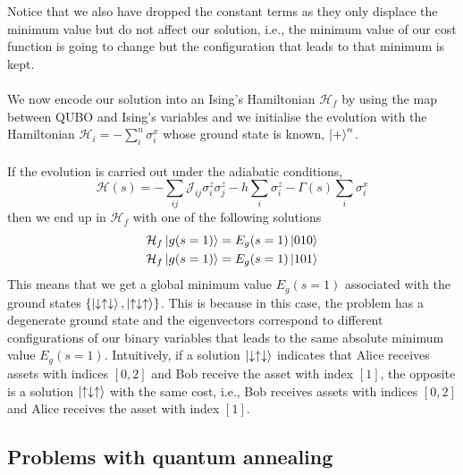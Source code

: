 Notice that we also have dropped the constant terms as they only displace the minimum value but do not affect our solution, i.e., the minimum value of our cost function is going to change but the configuration that leads to that minimum is kept.\\\\
We now encode our solution into an Ising's Hamiltonian $\mathcal{H}_{f}$ by using the map between QUBO and Ising's variables and we initialise the evolution with the Hamiltonian $\mathcal{H}_{i} = -\sum_{i}^{n}\sigma_{i}^{x}$ whose ground state is known, $\ket{+}^{n}$.\\\\
If the evolution is carried out under the adiabatic conditions,
\begin{equation}
    \mathcal{H}(s) = -\sum_{ij}\mathcal{J}_{ij}\sigma_{i}^{z}\sigma_{j}^{z} - h\sum_{i}\sigma_{i}^{z} - \Gamma(s)\sum_{i}\sigma_{i}^{x}
\end{equation}
then we end up in $\mathcal{H}_{f}$ with one of the following solutions
\begin{align}
    \mathcal{H}_{f}\ket{g(s=1)} = E_{g}(s=1)\ket{010} \\
    \mathcal{H}_{f}\ket{g(s=1)} = E_{g}(s=1)\ket{101}
\end{align}
This means that we get a global minimum value $E_{g}(s=1)$ associated with the ground states $\{\ket{\downarrow\uparrow\downarrow},\ket{\uparrow\downarrow\uparrow}\}$. This is because in this case, the problem has a degenerate ground state and the eigenvectors correspond to different configurations of our binary variables that leads to the same absolute minimum value $E_{g}(s=1)$. Intuitively, if a solution $\ket{\downarrow\uparrow\downarrow}$ indicates that Alice receives assets with indices $[0,2]$ and Bob receive the asset with index $[1]$, the opposite is a solution $\ket{\uparrow\downarrow\uparrow}$ with the same cost, i.e., Bob receives assets with indices $[0,2]$ and Alice receives the asset with index $[1]$.
\subsection{Problems with quantum annealing}

